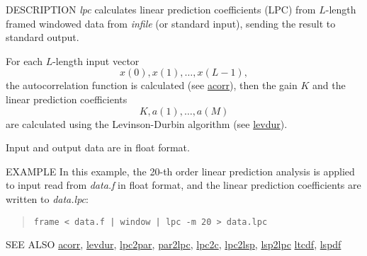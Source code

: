 \begin{synopsis}
\item [lpc] [ --l $L$ ] [ --m $M$ ] [ --f $F$ ] [ {\em infile} ] 
\end{synopsis}

\begin{qsection}{DESCRIPTION}
{\em lpc} calculates linear prediction coefficients (LPC) 
from $L$-length framed windowed data from {\em infile} (or standard input), 
sending the result to standard output.

For each $L$-length input vector
\begin{displaymath}
  x(0),x(1),\ldots,x(L-1), 
\end{displaymath}
the autocorrelation function is calculated (see \hyperlink{acorr}{acorr}),
then the gain $K$ and the linear prediction coefficients
\begin{displaymath}
  K, a(1), \ldots, a(M)
\end{displaymath}
are calculated using the Levinson-Durbin algorithm (see \hyperlink{levdur}{levdur}). 

Input and output data are in float format.
\end{qsection}

\begin{options}
\end{options}

\begin{qsection}{EXAMPLE}
In this example, the 20-th order linear prediction analysis is applied
to input read from {\em data.f} in float format,
and the linear prediction coefficients are written to
{\em data.lpc}:
\begin{quote}
 \verb!frame < data.f | window | lpc -m 20 > data.lpc!
\end{quote} 
\end{qsection}

\begin{qsection}{SEE ALSO}
\hyperlink{acorr}{acorr},
\hyperlink{levdur}{levdur},
\hyperlink{lpc2par}{lpc2par},
\hyperlink{par2lpc}{par2lpc},
\hyperlink{lpc2c}{lpc2c},
\hyperlink{lpc2lsp}{lpc2lsp},
\hyperlink{lsp2lpc}{lsp2lpc}
\hyperlink{ltcdf}{ltcdf},
\hyperlink{lspdf}{lspdf}
\end{qsection}
